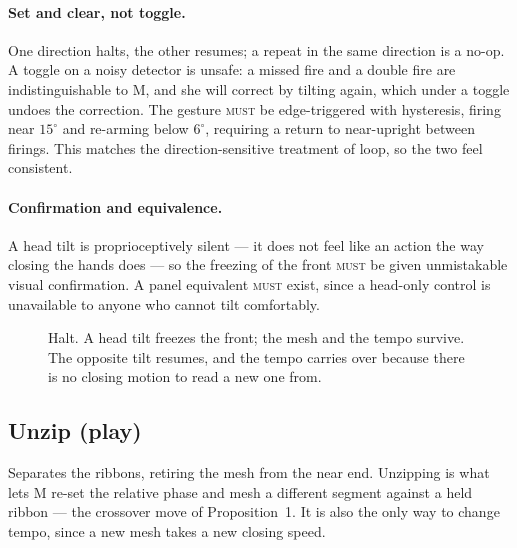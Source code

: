 \documentclass[11pt,a4paper]{article}
\newcommand{\MUST}{\textsc{must}}
\theoremstyle{definition}
\theoremstyle{plain}
\theoremstyle{remark}
\newcommand{\spools}{%
  \fill[ribL,opacity=.45,rounded corners=2pt] (1.55,5.40) rectangle (2.45,5.95);
  \fill[ribR,opacity=.45,rounded corners=2pt] (5.55,5.40) rectangle (6.45,5.95);
  \node[font=\scriptsize] at (2,6.22) {left spool};
  \node[font=\scriptsize] at (6,6.22) {right spool};
}
\newcommand{\musician}{%
  \draw[gray] (4,-0.10) circle (0.23);
  \node[font=\scriptsize] at (4,-0.10) {M};
}
\newcommand{\axes}{%
  \draw[->,gray,thin] (0.85,4.30) -- (1.45,4.30) node[right,font=\scriptsize]{$x$};
  \draw[->,gray,thin] (0.85,4.30) -- (0.85,4.90) node[above,font=\scriptsize]{$z$};
}
\newcommand{\ribbonszipped}{%
  \draw[ribL,opacity=.45,line width=16pt,line join=round]
    (2,5.40) -- (2,4.60) -- (3.72,4.20) -- (3.72,2.20) -- (3.10,1.70) -- (3.10,0.70);
  \draw[ribR,opacity=.45,line width=16pt,line join=round]
    (6,5.40) -- (6,4.60) -- (4.28,4.20) -- (4.28,2.20) -- (4.90,1.70) -- (4.90,0.70);
}
\newcommand{\mesh}[2]{%
  \draw[gray!75,decorate,decoration={zigzag,segment length=5pt,amplitude=3pt}]
    (4,#1) -- (4,#2);
}
\newcommand{\handat}[2]{\filldraw[fill=white,draw=gray!80,thin] (#1,#2) circle (0.17);}
\newcommand{\headroll}[2]{%
  \begin{scope}[shift={(#1,#2)},scale=0.62]
    \draw[gray] (0,0) circle (0.42);
    \draw[gray!70,thin,dashed] (0,-0.55) -- (0,0.62);
    \draw[gray,thick,rotate=20] (0,-0.50) -- (0,0.58);
    \draw[->,amb,thick] (-0.10,0.80) to[out=20,in=150] (0.42,0.62);
  \end{scope}}
\newcommand{\handsdefault}{\handat{3.10}{0.55}\handat{4.90}{0.55}}
\begin{document}
\paragraph{Set and clear, not toggle.} One direction halts, the other resumes; a repeat in the same
direction is a no-op. A toggle on a noisy detector is unsafe: a missed fire and a double fire are
indistinguishable to M, and she will correct by tilting again, which under a toggle undoes the
correction. The gesture \MUST{} be edge-triggered with hysteresis, firing near $15^\circ$ and
re-arming below $6^\circ$, requiring a return to near-upright between firings. This matches the
direction-sensitive treatment of loop, so the two feel consistent.

\paragraph{Confirmation and equivalence.} A head tilt is proprioceptively silent --- it does not
feel like an action the way closing the hands does --- so the freezing of the front \MUST{} be
given unmistakable visual confirmation. A panel equivalent \MUST{} exist, since a head-only control
is unavailable to anyone who cannot tilt comfortably.

\begin{figure}[H]\centering
{}
\caption{Halt. A head tilt freezes the front; the mesh and the tempo survive. The opposite tilt
resumes, and the tempo carries over because there is no closing motion to read a new one from.}
\end{figure}

\subsection{Unzip \normalfont(play)}

Separates the ribbons, retiring the mesh from the near end. Unzipping is what lets M re-set the
relative phase and mesh a different segment against a held ribbon --- the crossover move of
Proposition~1. It is also the only way to change tempo, since a new mesh takes a new closing speed.
\end{document}
